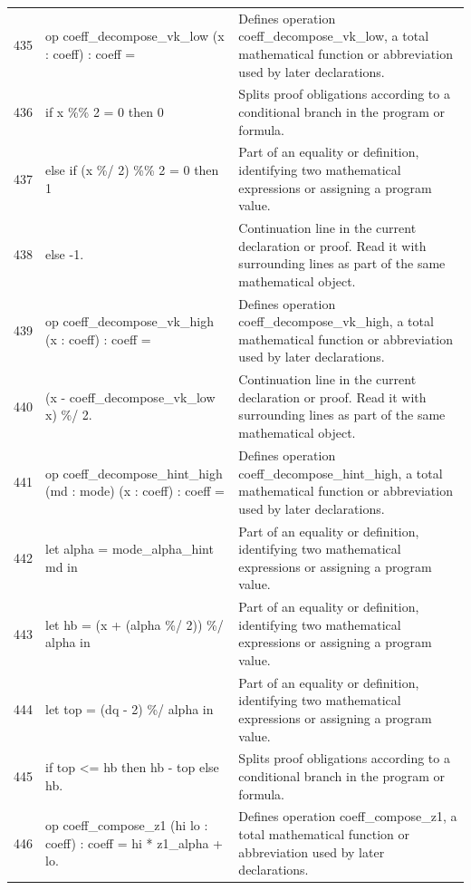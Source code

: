 \documentclass[10pt]{article}
\begin{document}
\begin{longtable}{r L{0.53\textwidth} L{0.37\textwidth}}
435 & {\ttfamily\scriptsize op coeff\_decompose\_vk\_low (x : coeff) : coeff =} & Defines operation coeff\_decompose\_vk\_low, a total mathematical function or abbreviation used by later declarations. \\
436 & {\ttfamily\scriptsize   if x \%\% 2 = 0 then 0} & Splits proof obligations according to a conditional branch in the program or formula. \\
437 & {\ttfamily\scriptsize   else if (x \%/ 2) \%\% 2 = 0 then 1} & Part of an equality or definition, identifying two mathematical expressions or assigning a program value. \\
438 & {\ttfamily\scriptsize   else -1.} & Continuation line in the current declaration or proof.  Read it with surrounding lines as part of the same mathematical object. \\
439 & {\ttfamily\scriptsize op coeff\_decompose\_vk\_high (x : coeff) : coeff =} & Defines operation coeff\_decompose\_vk\_high, a total mathematical function or abbreviation used by later declarations. \\
440 & {\ttfamily\scriptsize   (x - coeff\_decompose\_vk\_low x) \%/ 2.} & Continuation line in the current declaration or proof.  Read it with surrounding lines as part of the same mathematical object. \\
441 & {\ttfamily\scriptsize op coeff\_decompose\_hint\_high (md : mode) (x : coeff) : coeff =} & Defines operation coeff\_decompose\_hint\_high, a total mathematical function or abbreviation used by later declarations. \\
442 & {\ttfamily\scriptsize   let alpha = mode\_alpha\_hint md in} & Part of an equality or definition, identifying two mathematical expressions or assigning a program value. \\
443 & {\ttfamily\scriptsize   let hb = (x + (alpha \%/ 2)) \%/ alpha in} & Part of an equality or definition, identifying two mathematical expressions or assigning a program value. \\
444 & {\ttfamily\scriptsize   let top = (dq - 2) \%/ alpha in} & Part of an equality or definition, identifying two mathematical expressions or assigning a program value. \\
445 & {\ttfamily\scriptsize   if top <= hb then hb - top else hb.} & Splits proof obligations according to a conditional branch in the program or formula. \\
446 & {\ttfamily\scriptsize op coeff\_compose\_z1 (hi lo : coeff) : coeff = hi * z1\_alpha + lo.} & Defines operation coeff\_compose\_z1, a total mathematical function or abbreviation used by later declarations. \\

\end{longtable}
\end{document}
